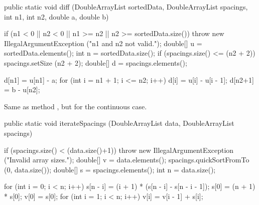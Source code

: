 \begin{code}

   public static void diff (DoubleArrayList sortedData,
                            DoubleArrayList spacings,
                            int n1, int n2, double a, double b)\begin{hide} {

      if (n1 < 0 || n2 < 0 || n1 >= n2 || n2 >= sortedData.size())
         throw new IllegalArgumentException ("n1 and n2 not valid.");
      double[] u = sortedData.elements();
      int n = sortedData.size();
      if (spacings.size() <= (n2 + 2))
         spacings.setSize (n2 + 2);
      double[] d = spacings.elements();

      d[n1] = u[n1] - a;
      for (int i = n1 + 1; i <= n2; i++)
         d[i] = u[i] - u[i - 1];
      d[n2+1] = b - u[n2];
   }\end{hide}
\end{code}
\begin{tabb} Same as method
  ,
   but for the continuous case.
\end{tabb}
\begin{htmlonly}
\end{htmlonly}
\begin{code}

   public static void iterateSpacings (DoubleArrayList data,
                                       DoubleArrayList spacings)\begin{hide} {
      if (spacings.size() < (data.size()+1))
         throw new IllegalArgumentException ("Invalid array sizes.");
      double[] v = data.elements();
      spacings.quickSortFromTo (0, data.size());
      double[] s = spacings.elements();
      int n = data.size();

      for (int i = 0; i < n; i++)
         s[n - i] = (i + 1) *  (s[n - i] - s[n - i - 1]);
      s[0] = (n + 1) * s[0];
      v[0] = s[0];
      for (int i = 1; i < n; i++)
         v[i] = v[i - 1] + s[i];
   }\end{hide}
\end{code}

